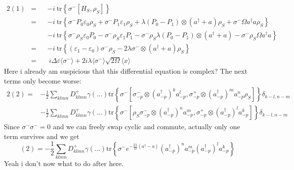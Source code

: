 	\begin{alignat*}{2}
		(1) &=	&&-i~ \text{tr}\left\{\sigma^- \left[H_S, \rho_S\right]\right\} \\
		&=	&&-i~ \text{tr} \left\{ \sigma^- P_0 \varepsilon_0 \rho_S + \sigma^- P_1 \varepsilon_1 \rho_S + \lambda (P_0 - P_1) \otimes (a^\dagger + a) \rho_S +\sigma^- \Omega a^\dagger a \rho_S \right\} \\
		& &&- i~ \text{tr} \left\{ \sigma^- \rho_S \varepsilon_0 P_0 - \sigma^- \rho_S \varepsilon_1 P_1 - \sigma^- \rho_S \lambda (P_0 - P_1) \otimes (a^\dagger +a) - \sigma^- \rho_S \Omega a^\dagger a\right\} \\
		&= && - i ~\text{tr} \left\{(\varepsilon_1 - \varepsilon_0)\sigma^- \rho_S - 2 \lambda \sigma^- \otimes (a^\dagger + a) \rho_S\right\} \\
		&= && ~i \Delta \varepsilon \langle \sigma^- \rangle + 2 i \lambda \langle \sigma^- \rangle \sqrt{2 \Omega} \langle x \rangle
	\end{alignat*}
	Here i already am suspicious that this differential equation is complex?
	The next terms only become worse:
	\begin{alignat*}{2}
		(2) =	&- \frac{1}{2} \sum_{klmn}^{}  D_{klmn}^+ \gamma(...) \text{tr}\left\{ \sigma^- \left[\sigma^-_{-p} \otimes (a^\dagger_{-p})^k a^l_{-p}, \sigma^+_{-p} \otimes (a^\dagger_{-p})^m a^n_{-p} {\rho}_S\right] \right\} \delta_{k-l, n-m} \\
		&- \frac{1}{2} \sum_{klmn}^{}  D_{klmn}^+ \gamma(...) \text{tr}\left\{ \sigma^- \left[\rho_S \sigma^-_{-p} \otimes (a^\dagger_{-p})^n a_{-p}^m, \sigma_{-p}^+ \otimes (a^\dagger_{-p})^l a_{-p}^k\right]\right\} \delta_{k-l, n-m}
	\end{alignat*}
	Since $\sigma^- \sigma^- = 0$ and we can freely swap cyclic and commute, actually only one term survives and we get
	\begin{equation}
		(2) =- \frac{1}{2} \sum_{klmn}^{}  D_{klmn}^+ \gamma(...) \text{tr} \left\{ \sigma^- e^{-\frac{2\lambda}{\Omega} (a^\dagger -a)}  (a^\dagger_{-p})^n a_{-p}^m  (a^\dagger_{-p})^l a_{-p}^k\right\}
	\end{equation}
	Yeah i don't now what to do after here.
	
